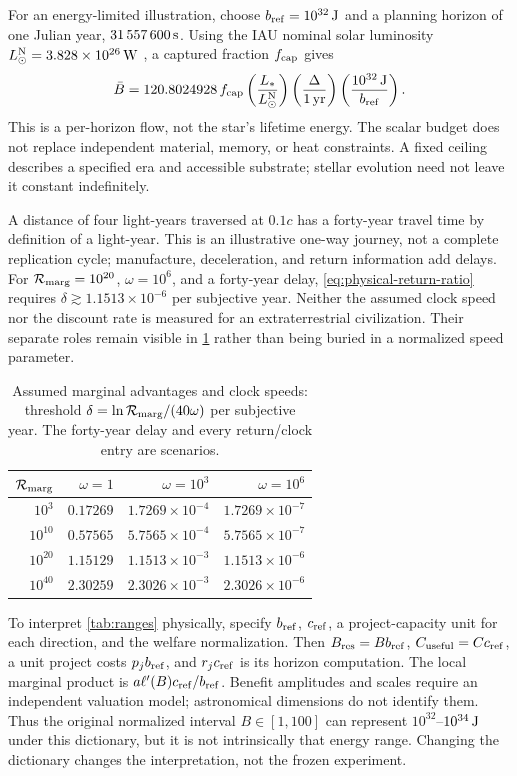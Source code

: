 For an energy-limited illustration, choose $b_{\rm ref}=10^{32}\,{\rm J}$
and a planning horizon of one Julian year, $31\,557\,600\,{\rm s}$.
Using the IAU nominal solar luminosity
$L_\odot^{\rm N}=3.828\times10^{26}\,{\rm W}$ \citep{IAU2015}, a captured
fraction $f_{\rm cap}$ gives
\begin{equation}
 \bar B=120.8024928\,f_{\rm cap}
 \left(\frac{L_*}{L_\odot^{\rm N}}\right)
 \left(\frac{\Delta}{1\,{\rm yr}}\right)
 \left(\frac{10^{32}\,{\rm J}}{b_{\rm ref}}\right).
 \label{eq:stellar-budget}
\end{equation}
This is a per-horizon flow, not the star's lifetime energy. The scalar
budget does not replace independent material, memory, or heat constraints.
A fixed ceiling describes a specified era and accessible substrate;
stellar evolution need not leave it constant indefinitely.

A distance of four light-years traversed at $0.1c$ has a forty-year
travel time by definition of a light-year. This is an illustrative
one-way journey, not a complete replication cycle; manufacture,
deceleration, and return information add delays. For
$\mathcal R_{\rm marg}=10^{20}$, $\omega=10^6$, and a forty-year delay,
\cref{eq:physical-return-ratio} requires
$\delta\gtrsim1.1513\times10^{-6}$ per subjective year.
Neither the assumed clock speed nor the discount rate is measured for
an extraterrestrial civilization. Their separate roles remain visible
in \cref{tab:latency-sensitivity} rather than being buried in a normalized
speed parameter.
\begin{table}[tbp]
\centering
\caption{Assumed marginal advantages and clock speeds: threshold
$\delta=\ln\mathcal R_{\rm marg}/(40\omega)$ per subjective year.
The forty-year delay and every return/clock entry are scenarios.}
\label{tab:latency-sensitivity}
\begin{tabular}{@{}rrrr@{}}\toprule
$\mathcal R_{\rm marg}$ & $\omega=1$ & $\omega=10^3$ & $\omega=10^6$\\\midrule
$10^3$ & $0.17269$ & $1.7269\times10^{-4}$ & $1.7269\times10^{-7}$\\
$10^{10}$ & $0.57565$ & $5.7565\times10^{-4}$ & $5.7565\times10^{-7}$\\
$10^{20}$ & $1.15129$ & $1.1513\times10^{-3}$ & $1.1513\times10^{-6}$\\
$10^{40}$ & $2.30259$ & $2.3026\times10^{-3}$ & $2.3026\times10^{-6}$\\\bottomrule
\end{tabular}
\end{table}

To interpret \cref{tab:ranges} physically, specify $b_{\rm ref}$,
$c_{\rm ref}$, a project-capacity unit for each direction, and the welfare
normalization. Then $B_{\rm res}=Bb_{\rm ref}$,
$C_{\rm useful}=Cc_{\rm ref}$, a unit project costs $p_jb_{\rm ref}$,
and $r_jc_{\rm ref}$ is its horizon computation. The local marginal
product is $a\ell'(B)c_{\rm ref}/b_{\rm ref}$. Benefit amplitudes and
scales require an independent valuation model; astronomical dimensions
do not identify them. Thus the original normalized interval $B\in[1,100]$
can represent $10^{32}$--$10^{34}\,{\rm J}$ under this dictionary, but
it is not intrinsically that energy range. Changing the dictionary
changes the interpretation, not the frozen experiment.
